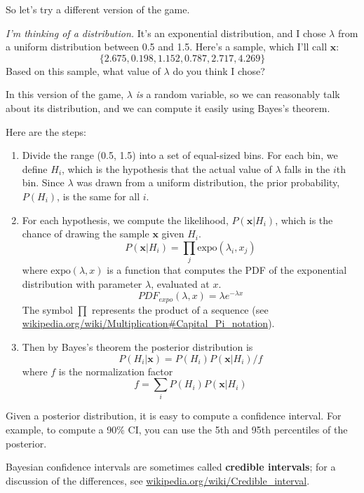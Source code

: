 \documentclass[12pt]{book}
\begin{document}
So let's try a different version of the game.

\newcommand{\boldx}{\mathbf{x}}


{\em I'm thinking of a distribution.}  It's an exponential
distribution, and I chose $\lambda$ from a uniform distribution
between 0.5 and 1.5.  Here's a sample, which I'll call $\boldx$:
%
\[ \{ 2.675, 0.198, 1.152, 0.787, 2.717, 4.269 \} \]
%
Based on this sample, what value of $\lambda$ do you think I chose?

In this version of the game, $\lambda$ {\em is} a random variable, so we
can reasonably talk about its distribution, and we can compute it
easily using Bayes's theorem.

Here are the steps:

\begin{enumerate}

\item Divide the range (0.5, 1.5) into a set of equal-sized bins.
For each bin, we define $H_i$, which is the hypothesis that the
actual value of $\lambda$ falls in the $i$th bin.
Since $\lambda$ was drawn from a uniform distribution, the prior
probability, $P(H_i)$, is the same for all $i$.

\item For each hypothesis, we compute the likelihood, $P(\boldx|H_i)$,
which is the chance of drawing the sample $\boldx$ given $H_i$.
%
\[ P(\boldx|H_i) = \prod_j \mathrm{expo}(\lambda_i, x_j)  \]
%
where $\mathrm{expo}(\lambda, x)$ is a function that
computes the PDF of the exponential distribution with parameter $\lambda$,
evaluated at $x$.  
%
\[ PDF_{expo}(\lambda, x) = \lambda e^{-\lambda x}\]
%
The symbol $\prod$ represents the product of a sequence (see
\url{wikipedia.org/wiki/Multiplication#Capital_Pi_notation}).

\item Then by Bayes's theorem the posterior distribution is
%
\[ P(H_i|\boldx) =  P(H_i) P(\boldx|H_i) / f \]
%
where $f$ is the normalization factor
%
\[ f = \sum_i P(H_i) P(\boldx|H_i) \]
%
\end{enumerate}

Given a posterior distribution, it is easy to compute a confidence
interval.  For example, to compute a 90\% CI, you can
use the 5th and 95th percentiles of the posterior.

Bayesian confidence intervals are sometimes called {\bf credible
intervals}; for a discussion of the differences, see
\url{wikipedia.org/wiki/Credible_interval}.
\end{document}
